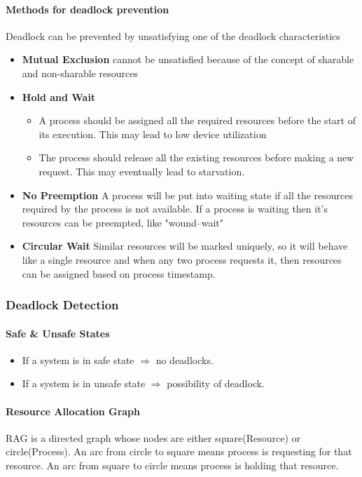\paragraph{Methods for deadlock prevention}
Deadlock can be prevented by unsatisfying one of the deadlock characteristics
\begin{itemize}
    \item \textbf{Mutual Exclusion} cannot be unsatisfied because of the concept of sharable and non-sharable resources
    \item \textbf{Hold and Wait}
    \begin{itemize}
        \item A process should be assigned all the required resources before the start of its execution. This may lead to low device utilization
        \item The process should release all the existing resources before making a new request. This may eventually lead to starvation.
    \end{itemize}
    \item \textbf{No Preemption} A process will be put into waiting state if all the resources required by the process is not available. If a process is waiting then it's resources can be preempted, like "wound–wait"
    \item \textbf{Circular Wait} Similar resources will be marked uniquely, so it will behave like a single resource and when any two process requests it, then resources can be assigned based on process timestamp.
\end{itemize}

\subsubsection{Deadlock Detection}
\paragraph{Safe \& Unsafe States}
\begin{itemize}
    \item If a system is in safe state  $\Rightarrow$ no deadlocks.
    \item If a system is in unsafe state $\Rightarrow$ possibility of deadlock.
\end{itemize}
\paragraph{Resource Allocation Graph}
RAG is a directed graph whose nodes are either square(Resource) or circle(Process). An arc from circle to square means process is requesting for that resource. An arc from square to circle means process is holding that resource.


